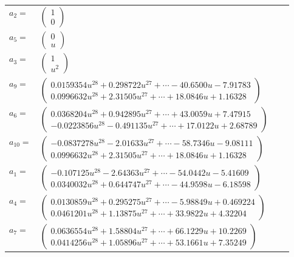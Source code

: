 \documentclass[1p]{elsarticle_modified}
\theoremstyle{definition}
\begin{document}
\begin{tabular}{m{7pt} m{180pt} m{7pt} m{180pt} }
\flushright $a_{2}=$&$\begin{pmatrix}1\\0\end{pmatrix}$ \\
\flushright $a_{5}=$&$\begin{pmatrix}0\\u\end{pmatrix}$ \\
\flushright $a_{3}=$&$\begin{pmatrix}1\\u^2\end{pmatrix}$ \\
\flushright $a_{9}=$&$\begin{pmatrix}0.0159354 u^{28}+0.298722 u^{27}+\cdots-40.6500 u-7.91783\\0.0996632 u^{28}+2.31505 u^{27}+\cdots+18.0846 u+1.16328\end{pmatrix}$ \\
\flushright $a_{6}=$&$\begin{pmatrix}0.0368204 u^{28}+0.942895 u^{27}+\cdots+43.0059 u+7.47915\\-0.0223856 u^{28}-0.491135 u^{27}+\cdots+17.0122 u+2.68789\end{pmatrix}$ \\
\flushright $a_{10}=$&$\begin{pmatrix}-0.0837278 u^{28}-2.01633 u^{27}+\cdots-58.7346 u-9.08111\\0.0996632 u^{28}+2.31505 u^{27}+\cdots+18.0846 u+1.16328\end{pmatrix}$ \\
\flushright $a_{1}=$&$\begin{pmatrix}-0.107125 u^{28}-2.64363 u^{27}+\cdots-54.0442 u-5.41609\\0.0340032 u^{28}+0.644747 u^{27}+\cdots-44.9598 u-6.18598\end{pmatrix}$ \\
\flushright $a_{4}=$&$\begin{pmatrix}0.0130859 u^{28}+0.295275 u^{27}+\cdots-5.98849 u+0.469224\\0.0461201 u^{28}+1.13875 u^{27}+\cdots+33.9822 u+4.32204\end{pmatrix}$ \\
\flushright $a_{7}=$&$\begin{pmatrix}0.0636554 u^{28}+1.58804 u^{27}+\cdots+66.1229 u+10.2269\\0.0414256 u^{28}+1.05896 u^{27}+\cdots+53.1661 u+7.35249\end{pmatrix}$ \\

\end{tabular}
\end{document}
